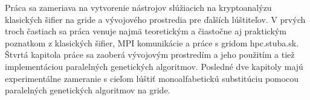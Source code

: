 Práca sa zameriava na vytvorenie nástrojov slúžiacich na kryptoanalýzu
klasických šifier na gride a vývojového prostredia pre ďalších lúštiteľov.
V prvých troch častiach sa práca venuje najmä teoretickým a čiastočne aj praktickým
poznatkom z klasických šifier, MPI komunikácie a práce s gridom hpc.stuba.sk.
Štvrtá kapitola práce sa zaoberá vývojovým prostredím a jeho použitím a tiež
implementáciou paralelných genetických algoritmov.
Posledné dve kapitoly majú experimentálne zameranie
s cieľom lúštiť monoalfabetickú substitúciu pomocou paralelných genetických algoritmov na gride.
